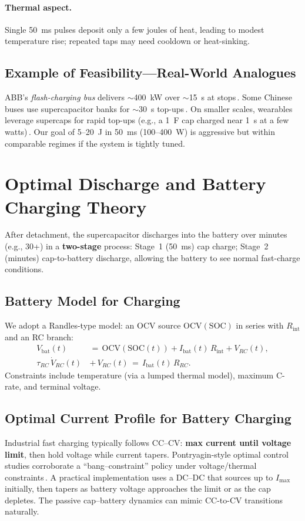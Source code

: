 \documentclass[11pt]{article}
\begin{document}
\paragraph{Thermal aspect.} Single 50~ms pulses deposit only a few joules of heat, leading to modest temperature rise; repeated taps may need cooldown or heat-sinking.

\subsection{Example of Feasibility---Real-World Analogues}
ABB's \textit{flash-charging bus} delivers $\sim$400~kW over $\sim$15~s at stops\,\cite{abb-bus}. Some Chinese buses use supercapacitor banks for $\sim$30~s top-ups\,\cite{volfpack-blog}. On smaller scales, wearables leverage supercaps for rapid top-ups (e.g., a 1~F cap charged near 1~s at a few watts)\,\cite{volfpack-blog}. Our goal of 5--20~J in 50~ms (100--400~W) is aggressive but within comparable regimes if the system is tightly tuned.

\section{Optimal Discharge and Battery Charging Theory}
After detachment, the supercapacitor discharges into the battery over minutes (e.g., 30+) in a \textbf{two-stage} process: Stage~1 (50~ms) cap charge; Stage~2 (minutes) cap-to-battery discharge, allowing the battery to see normal fast-charge conditions.

\subsection{Battery Model for Charging}
We adopt a Randles-type model: an OCV source $\mathrm{OCV}(\mathrm{SOC})$ in series with $R_{\!\mathrm{int}}$ and an RC branch:
\begin{align}
  V_{\!\mathrm{bat}}(t) \,&=\, \mathrm{OCV}(\mathrm{SOC}(t)) + I_{\!\mathrm{bat}}(t)\,R_{\!\mathrm{int}} + V_{\!RC}(t),\\
  \tau_{\!RC}\, \dot V_{\!RC}(t) \,&+\, V_{\!RC}(t) \,=\, I_{\!\mathrm{bat}}(t)\,R_{\!RC}.
\end{align}
Constraints include temperature (via a lumped thermal model), maximum C-rate, and terminal voltage.

\subsection{Optimal Current Profile for Battery Charging}
Industrial fast charging typically follows CC--CV: \textbf{max current until voltage limit}, then hold voltage while current tapers. Pontryagin-style optimal control studies corroborate a ``bang--constraint'' policy under voltage/thermal constraints\,\cite{pmp-battery}. A practical implementation uses a DC--DC that sources up to $I_{\!\max}$ initially, then tapers as battery voltage approaches the limit or as the cap depletes. The passive cap--battery dynamics can mimic CC-to-CV transitions naturally.
\end{document}
